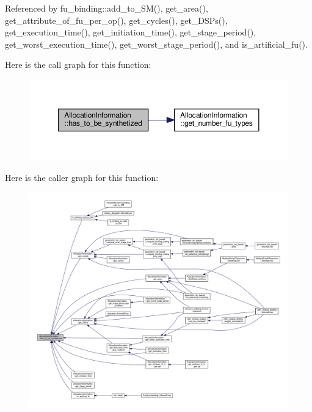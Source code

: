 Referenced by fu\+\_\+binding\+::add\+\_\+to\+\_\+\+S\+M(), get\+\_\+area(), get\+\_\+attribute\+\_\+of\+\_\+fu\+\_\+per\+\_\+op(), get\+\_\+cycles(), get\+\_\+\+D\+S\+Ps(), get\+\_\+execution\+\_\+time(), get\+\_\+initiation\+\_\+time(), get\+\_\+stage\+\_\+period(), get\+\_\+worst\+\_\+execution\+\_\+time(), get\+\_\+worst\+\_\+stage\+\_\+period(), and is\+\_\+artificial\+\_\+fu().

Here is the call graph for this function\+:
\nopagebreak
\begin{figure}[H]
\begin{center}
\leavevmode
\includegraphics[width=350pt]{d7/d79/classAllocationInformation_a396f27c9f8392246c8e652dd6501f59c_cgraph}
\end{center}
\end{figure}
Here is the caller graph for this function\+:
\nopagebreak
\begin{figure}[H]
\begin{center}
\leavevmode
\includegraphics[width=350pt]{d7/d79/classAllocationInformation_a396f27c9f8392246c8e652dd6501f59c_icgraph}
\end{center}
\end{figure}
\mbox{\label{classAllocationInformation_ad1263fb5b76f2dd97daacfcf3012f3e4}} 
